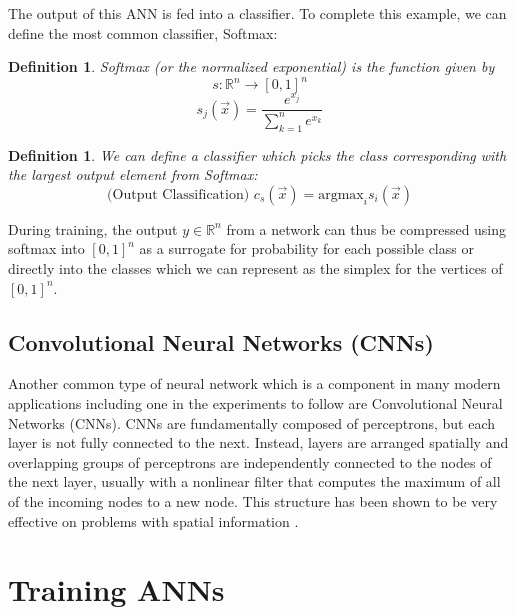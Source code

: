 \documentclass[10pt]{extarticle}
\newtheorem{definition}[theorem]{Definition}
\newcommand{\R}{\mathbb{R}}
\begin{document}


The output of this ANN is fed into a classifier. To complete this
example, we can define the most common classifier, Softmax:


\begin{definition}{Softmax (or the normalized exponential) is the function given by}
\[s : \R^n \to [0,1]^n\]
\[s_j(\vec x) = \frac{e^{x_j}}{\sum_{k = 1}^n e^{x_k}}\]
\end{definition}

\begin{definition}{We can define a classifier which picks the class corresponding with the largest output element from Softmax: }
\[\text{(Output Classification)  }   c_s(\vec x) = \text{argmax}_{i} s_i(\vec{x})\]
\end{definition}
During training, the output $y \in \R^n$ from a network can thus be compressed using softmax into $[0,1]^n$ as a surrogate for probability for each possible class or directly into the classes which we can represent as the simplex for the vertices of $[0,1]^n$. 

\cite{Bishop:2006:PRM:1162264}

\subsection{Convolutional Neural Networks (CNNs)}\label{cnn}

Another common type of neural network which is a component in many modern applications including one in the experiments to follow are Convolutional Neural Networks (CNNs). CNNs are fundamentally composed of
perceptrons, but each layer is not fully connected to the
next. Instead, layers are arranged spatially and overlapping groups of perceptrons are independently connected to the nodes of the next layer, usually with a nonlinear filter that computes the maximum of all of the incoming nodes to a new node. This structure has been shown to be very effective on problems with spatial information \cite{lecun1995convolutional}. 

\section{Training ANNs}
\end{document}
